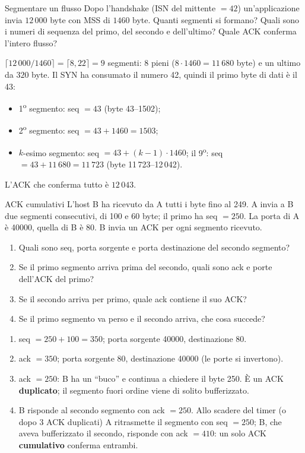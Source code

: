 \begin{esercizio}{Segmentare un flusso}
Dopo l'handshake (ISN del mittente $= 42$) un'applicazione invia $12\,000$ byte con MSS di $1460$ byte. Quanti segmenti si
formano? Quali sono i numeri di sequenza del primo, del secondo e dell'ultimo? Quale ACK conferma l'intero flusso?
\end{esercizio}

\svolgimento
$\lceil 12\,000 / 1460 \rceil = \lceil 8{,}22 \rceil = 9$ segmenti: 8 pieni ($8 \cdot 1460 = 11\,680$ byte) e un ultimo da
$320$ byte. Il SYN ha consumato il numero 42, quindi il primo byte di dati è il 43:
\begin{itemize}
    \item 1\textsuperscript{o} segmento: seq $= 43$ (byte 43--1502);
    \item 2\textsuperscript{o} segmento: seq $= 43 + 1460 = 1503$;
    \item $k$-esimo segmento: seq $= 43 + (k-1)\cdot 1460$; il 9\textsuperscript{o}: seq $= 43 + 11\,680 = 11\,723$ (byte 11\,723--12\,042).
\end{itemize}
L'ACK che conferma tutto è $12\,043$.

\begin{esercizio}{ACK cumulativi}
L'host B ha ricevuto da A tutti i byte fino al 249. A invia a B due segmenti consecutivi, di 100 e 60 byte; il primo ha seq
$= 250$. La porta di A è 40000, quella di B è 80. B invia un ACK per ogni segmento ricevuto.
\begin{enumerate}[label=(\alph*)]
    \item Quali sono seq, porta sorgente e porta destinazione del secondo segmento?
    \item Se il primo segmento arriva prima del secondo, quali sono ack e porte dell'ACK del primo?
    \item Se il secondo arriva per primo, quale ack contiene il suo ACK?
    \item Se il primo segmento va perso e il secondo arriva, che cosa succede?
\end{enumerate}
\end{esercizio}

\svolgimento
\begin{enumerate}[label=(\alph*)]
    \item seq $= 250 + 100 = 350$; porta sorgente 40000, destinazione 80.
    \item ack $= 350$; porta sorgente 80, destinazione 40000 (le porte si invertono).
    \item ack $= 250$: B ha un ``buco'' e continua a chiedere il byte 250. È un ACK \textbf{duplicato}; il segmento fuori ordine
          viene di solito bufferizzato.
    \item B risponde al secondo segmento con ack $= 250$. Allo scadere del timer (o dopo 3 ACK duplicati) A ritrasmette il segmento
          con seq $= 250$; B, che aveva bufferizzato il secondo, risponde con ack $= 410$: un solo ACK \textbf{cumulativo} conferma
          entrambi.
\end{enumerate}

